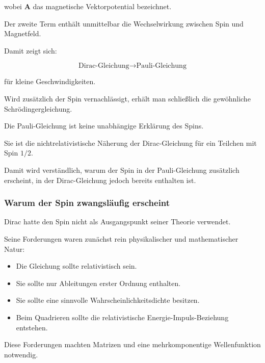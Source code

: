 wobei \(\mathbf{A}\) das magnetische Vektorpotential%
 bezeichnet.

Der zweite Term enthält unmittelbar die Wechselwirkung zwischen Spin
und Magnetfeld.

Damit zeigt sich:

\begin{equation}
	\text{Dirac-Gleichung}
	\longrightarrow
	\text{Pauli-Gleichung}
\end{equation}

für kleine Geschwindigkeiten.

Wird zusätzlich der Spin vernachlässigt, erhält man schließlich die
gewöhnliche Schrödingergleichung.

\begin{DidacticBox}
	\label{box:pauli_gleichung_naeherung_dirac}
	
	Die Pauli-Gleichung ist keine unabhängige Erklärung des Spins.
	
	Sie ist die nichtrelativistische Näherung der Dirac-Gleichung für ein
	Teilchen mit Spin \(1/2\).
	
	Damit wird verständlich, warum der Spin in der Pauli-Gleichung
	zusätzlich erscheint, in der Dirac-Gleichung jedoch bereits enthalten
	ist.
\end{DidacticBox}

\subsubsection*{Warum der Spin zwangsläufig erscheint}

Dirac hatte den Spin nicht als Ausgangspunkt seiner Theorie verwendet.

Seine Forderungen waren zunächst rein physikalischer und mathematischer
Natur:

\begin{itemize}
	\item Die Gleichung sollte relativistisch sein.
	\item Sie sollte nur Ableitungen erster Ordnung enthalten.
	\item Sie sollte eine sinnvolle Wahrscheinlichkeitsdichte besitzen.
	\item Beim Quadrieren sollte die relativistische
	Energie-Impuls-Beziehung entstehen.
\end{itemize}

Diese Forderungen machten Matrizen und eine mehrkomponentige
Wellenfunktion notwendig.

